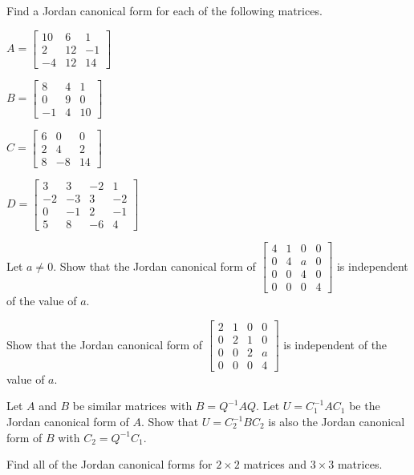 \be
\item Find a Jordan canonical form for each of the following matrices.
	\ba
	\item $A=\left[ \begin{array}{rcr} 10&6&1\\2&12&-1\\-4&12&14 \end{array} \right]$
	\item $B=\left[ \begin{array}{rcc} 8&4&1\\0&9&0\\-1&4&10 \end{array} \right]$
	\item $C=\left[ \begin{array}{crc} 6&0&0\\2&4&2\\8&-8&14 \end{array} \right]$
	\item $D=\left[ \begin{array}{rrrr} 3&3&-2&1\\-2&-3&3&-2\\0&-1&2&-1\\5&8&-6&4 \end{array} \right]$
	\ea
	
\item Let $a \neq 0$. Show that the Jordan canonical form of $\left[ \begin{array}{cccc} 4&1&0&0 \\ 0&4&a&0 \\ 0&0&4&0 \\ 0&0&0&4 \end{array} \right]$ is independent of the value of $a$. 

\item Show that the Jordan canonical form of $\left[ \begin{array}{cccc} 2&1&0&0 \\ 0&2&1&0 \\ 0&0&2&a \\ 0&0&0&4 \end{array} \right]$ is independent of the value of $a$. 

\item Let $A$ and $B$ be similar matrices with $B = Q^{-1}AQ$. Let $U = C_1^{-1}AC_1$ be the Jordan canonical form of $A$. Show that $U = C_2^{-1}BC_2$ is also the Jordan canonical form of $B$ with $C_2 = Q^{-1}C_1$. 

\item Find all of the Jordan canonical forms for $2 \times 2$ matrices and $3 \times 3$ matrices. 

